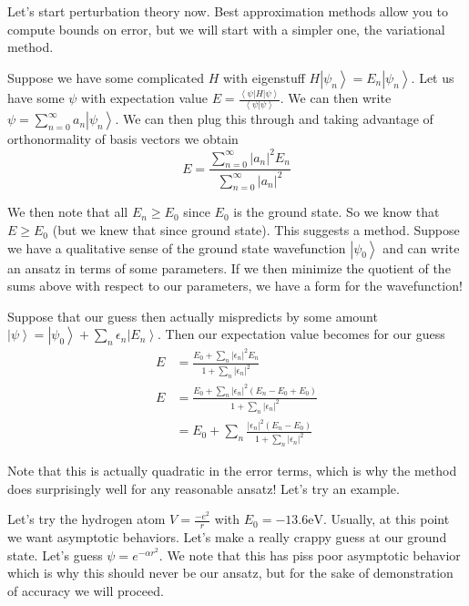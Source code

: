 \documentclass[10pt]{report}
\newcommand{\bra}[1]{\left<#1\right|}
\newcommand{\ket}[1]{\left|#1\right>}
\newcommand{\dotp}[2]{\left<#1\left.\right|#2\right>}
\newcommand{\abs}[1]{\left|#1\right|}
\begin{document}
Let's start perturbation theory now. Best approximation methods allow you to compute bounds on error, but we will start with a simpler one, the variational method.

Suppose we have some complicated $H$ with eigenstuff $H\ket{\psi_n} = E_n\ket{\psi_n}$. Let us have some $\psi$ with expectation value $E = \frac{\bra{\psi}H\ket{\psi}}{\dotp{\psi}{\psi}}$. We can then write $\psi = \sum_{n=0}^\infty a_n \ket{\psi_n}$. We can then plug this through and taking advantage of orthonormality of basis vectors we obtain
$$E = \frac{\sum_{n=0}^\infty \abs{a_n}^2 E_n}{\sum_{n=0}^\infty \abs{a_n}^2}$$

We then note that all $E_n \geq E_0$ since $E_0$ is the ground state. So we know that $E \geq E_0$ (but we knew that since ground state). This suggests a method. Suppose we have a qualitative sense of the ground state wavefunction $\ket{\psi_0}$ and can write an ansatz in terms of some parameters. If we then minimize the quotient of the sums above with respect to our parameters, we have a form for the wavefunction!

Suppose that our guess then actually mispredicts by some amount $\ket{\psi} = \ket{\psi_0} + \sum_n \epsilon_n \ket{E_n}$. Then our expectation value becomes for our guess
\begin{align*}
    E &= \frac{E_0 + \sum_n \abs{\epsilon_n}^2 E_n}{1+\sum_n \abs{\epsilon_n}^2}\\
    E &= \frac{E_0 + \sum_n \abs{\epsilon_n}^2 (E_n - E_0 + E_0)}{1+\sum_n \abs{\epsilon_n}^2}\\
    &= E_0 + \sum_n \frac{\abs{\epsilon_n}^2 \left( E_n - E_0 \right)}{1+\sum_n \abs{\epsilon_n}^2}
\end{align*}

Note that this is actually quadratic in the error terms, which is why the method does surprisingly well for any reasonable ansatz! Let's try an example.

Let's try the hydrogen atom $V = \frac{-e^2}{r}$ with $E_0 = -13.6\mathrm{eV}$. Usually, at this point we want asymptotic behaviors. Let's make a really crappy guess at our ground state. Let's guess $\psi = e^{-\alpha r^2}$. We note that this has piss poor asymptotic behavior which is why this should never be our ansatz, but for the sake of demonstration of accuracy we will proceed.
\end{document}
